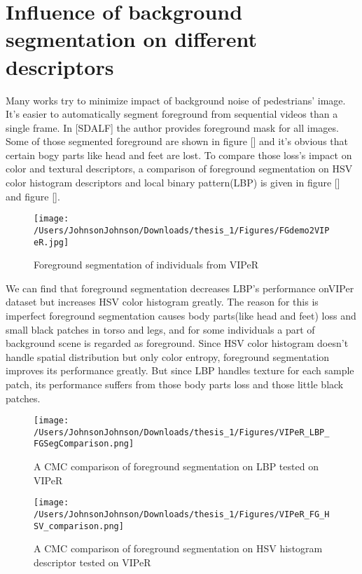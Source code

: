 \section{Influence of background segmentation on different descriptors}
Many works try to minimize impact of background noise of pedestrians' image. It's easier to automatically segment foreground from sequential videos than a single frame. In [SDALF] the author provides foreground mask for all images.  Some of those segmented foreground are shown in figure [] and it's obvious that certain bogy parts like head and feet are lost. To compare those loss's impact on color and textural descriptors, a comparison of foreground segmentation on HSV color histogram descriptors and local binary pattern(LBP) is given in figure [] and figure []. 


\begin{figure}[H]
\centering
\texttt{[image: /Users/JohnsonJohnson/Downloads/thesis\_1/Figures/FGdemo2VIPeR.jpg]}
\caption{Foreground segmentation of individuals from VIPeR }
\vspace{0em}
\end{figure} 

We can find that foreground segmentation decreases LBP's performance onVIPer dataset but increases HSV color histogram greatly. The reason for this is imperfect foreground segmentation causes body parts(like head and feet) loss and small black patches in torso and legs, and for some individuals a part of background scene is regarded as foreground. Since HSV color histogram doesn't handle spatial distribution but only color entropy, foreground segmentation improves its performance greatly. But since LBP handles texture for each sample patch, its performance suffers from those body parts loss and those little black patches. 

\begin{figure}[H]
\centering

\texttt{[image: /Users/JohnsonJohnson/Downloads/thesis\_1/Figures/VIPeR\_LBP\_FGSegComparison.png]}
\caption{A CMC comparison of foreground segmentation on LBP tested on VIPeR }
\vspace{0em}
\end{figure} 

\begin{figure}[H]
\centering
\texttt{[image: /Users/JohnsonJohnson/Downloads/thesis\_1/Figures/VIPeR\_FG\_HSV\_comparison.png]}
\caption{A CMC comparison of foreground segmentation on HSV histogram descriptor tested on VIPeR}
\vspace{0em}
\end{figure} 


